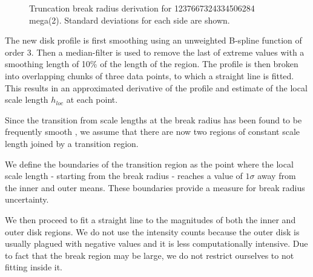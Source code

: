 \begin{figure}[h]
	\centering
	\caption{Truncation break radius derivation for 1237667324334506284 mega(2). Standard deviations for each side are shown.}
\end{figure}

The new disk profile is first smoothing using an unweighted B-spline function \citep{dierckx_curve_1975} of order 3. Then a median-filter is used to remove the last of extreme values with a smoothing length of 10\% of the length of the region.
The profile is then broken into overlapping chunks of three data points, to which a straight line is fitted. This results in an approximated derivative of the profile and estimate of the local scale length $h_{loc}$ at each point. 

Since the transition from scale lengths at the break radius has been found to be frequently smooth \citep{erwin_outer_2008,pohlen_stellar_2004,maltby_anti-truncated_2011}, we assume that there are now two regions of constant scale length joined by a transition region. 

We define the boundaries of the transition region as the point where the local scale length - starting from the break radius - reaches a value of $1\sigma$ away from the inner and outer means. These boundaries provide a measure for break radius uncertainty. 

We then proceed to fit a straight line to the magnitudes of both the inner and outer disk regions. We do not use the intensity counts because the outer disk is usually plagued with negative values and it is less computationally intensive. Due to fact that the break region may be large, we do not restrict ourselves to not fitting inside it.

